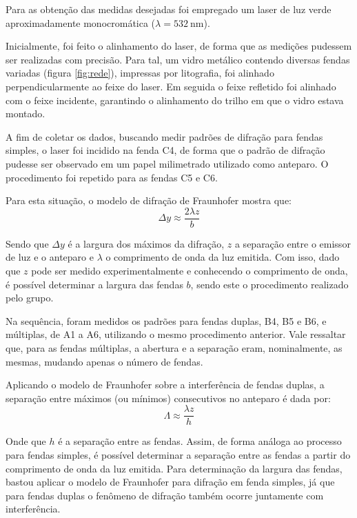 Para as obtenção das medidas desejadas foi empregado um laser de luz verde aproximadamente monocromática ($\lambda = \SI{532}{\nano\meter}$).

Inicialmente, foi feito o alinhamento do laser, de forma que as medições pudessem ser realizadas com precisão. Para tal, um vidro metálico contendo diversas fendas variadas (figura \ref{fig:rede}), impressas por litografia, foi alinhado perpendicularmente ao feixe do laser. Em seguida o feixe refletido foi alinhado com o feixe incidente, garantindo o alinhamento do trilho em que o vidro estava montado.



A fim de coletar os dados, buscando medir padrões de difração para fendas simples, o laser foi incidido na fenda C4, de forma que o padrão de difração pudesse ser observado em um papel milimetrado utilizado como anteparo. O procedimento foi repetido para as fendas C5 e C6.

Para esta situação, o modelo de difração de Fraunhofer mostra que:
\begin{equation*}
    \Delta y \approx \frac{2 \lambda z}{b} \label{eq:difr}
\end{equation*}

Sendo que $\Delta y$ é a largura dos máximos da difração, $z$ a separação entre o emissor de luz e o anteparo e $\lambda$ o comprimento de onda da luz emitida. Com isso, dado que $z$ pode ser medido experimentalmente e conhecendo o comprimento de onda, é possível determinar a largura das fendas $b$, sendo este o procedimento realizado pelo grupo.

Na sequência, foram medidos os padrões para fendas duplas, B4, B5 e B6, e múltiplas, de A1 a A6, utilizando o mesmo procedimento anterior. Vale ressaltar que, para as fendas múltiplas, a abertura e a separação eram, nominalmente, as mesmas, mudando apenas o número de fendas.

Aplicando o modelo de Fraunhofer sobre a interferência de fendas duplas, a separação entre máximos (ou mínimos) consecutivos no anteparo é dada por:
\begin{equation}
    \Lambda \approx \frac{\lambda z}{h} \label{eq:duplas}
\end{equation}

Onde que $h$ é a separação entre as fendas. Assim, de forma análoga ao processo para fendas simples, é possível determinar a separação entre as fendas a partir do comprimento de onda da luz emitida. Para determinação da largura das fendas, bastou aplicar o modelo de Fraunhofer para difração em fenda simples, já que para fendas duplas o fenômeno de difração também ocorre juntamente com interferência.

